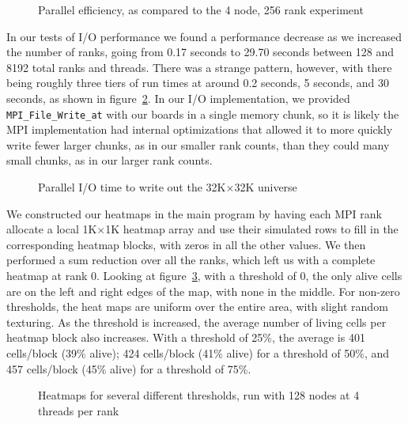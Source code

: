 \documentclass[12pt,letterpaper]{article}
\newlength\figureheight
\newlength\figurewidth
\begin{document}
\begin{figure}[htb]
    \centering
    
    \caption{Parallel efficiency, as compared to the 4 node, 256 rank experiment}
    \label{fig:efficiency-comparison}
\end{figure}

In our tests of I/O performance we found a performance decrease as we increased the number of ranks, going from 0.17 seconds to 29.70 seconds between 128 and 8192 total ranks and threads.
There was a strange pattern, however, with there being roughly three tiers of run times at around 0.2 seconds, 5 seconds, and 30 seconds, as shown in figure~\ref{fig:io-comparison}.
In our I/O implementation, we provided \texttt{MPI\_File\_Write\_at} with our boards in a single memory chunk, so it is likely the MPI implementation had internal optimizations that allowed it to more quickly write fewer larger chunks, as in our smaller rank counts, than they could many small chunks, as in our larger rank counts.

\begin{figure}[!htb]
    \centering
    
    \caption{Parallel I/O time to write out the 32K$\times$32K universe}
    \label{fig:io-comparison}
\end{figure}

We constructed our heatmaps in the main program by having each MPI rank allocate a local 1K$\times$1K heatmap array and use their simulated rows to fill in the corresponding heatmap blocks, with zeros in all the other values.
We then performed a sum reduction over all the ranks, which left us with a complete heatmap at rank 0.
Looking at figure~\ref{fig:heatmap}, with a threshold of 0, the only alive cells are on the left and right edges of the map, with none in the middle.
For non-zero thresholds, the heat maps are uniform over the entire area, with slight random texturing.
As the threshold is increased, the average number of living cells per heatmap block  also increases.
With a threshold of 25\%, the average is 401 cells/block (39\% alive); 424 cells/block (41\% alive) for a threshold of 50\%, and 457 cells/block (45\% alive) for a threshold of 75\%.

\begin{figure}[htb]
    \centering
    \setlength\figureheight{\textwidth}
    \setlength\figurewidth{\textwidth}
    
    \caption{Heatmaps for several different thresholds, run with 128 nodes at 4 threads per rank}
    \label{fig:heatmap}
\end{figure}
\end{document}
